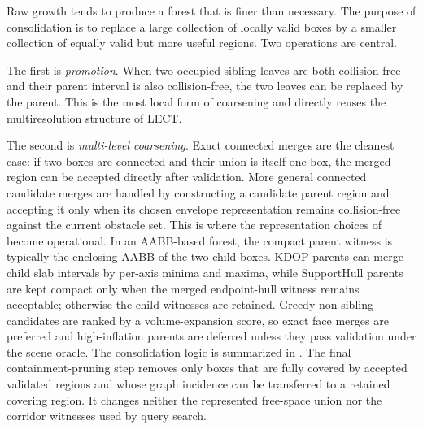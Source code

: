\documentclass[journal]{IEEEtran}
\begin{document}
Raw growth tends to produce a forest that is finer than necessary. The purpose
of consolidation is to replace a large collection of locally valid
boxes by a smaller collection of equally valid but more useful regions.
Two operations are central.

The first is \emph{promotion}. When two occupied sibling leaves are both
collision-free and their parent interval is also collision-free, the two leaves can be
replaced by the parent. This is the most local form of coarsening and directly
reuses the multiresolution structure of LECT.

The second is \emph{multi-level coarsening}. Exact connected merges are the
cleanest case: if two boxes are connected and their union is itself one box,
the merged region can be accepted directly after validation. More general
connected candidate merges are handled by constructing a candidate parent
region and accepting it only when its chosen envelope representation remains
collision-free against the current obstacle set. This is where the representation choices of
 become operational. In an AABB-based forest, the compact parent witness
is typically the enclosing AABB of the two child boxes. KDOP parents can merge
child slab intervals by per-axis minima and maxima, while SupportHull parents
are kept compact only when the merged endpoint-hull witness remains acceptable;
otherwise the child witnesses are retained. Greedy non-sibling candidates are
ranked by a volume-expansion score, so exact face merges are preferred and
high-inflation parents are deferred unless they pass validation under the
scene oracle. The consolidation logic is summarized in
.
The final containment-pruning step removes only boxes that are fully covered by
accepted validated regions and whose graph incidence can be transferred to a
retained covering region. It changes neither the represented
free-space union nor the corridor witnesses used by query search.
\end{document}
